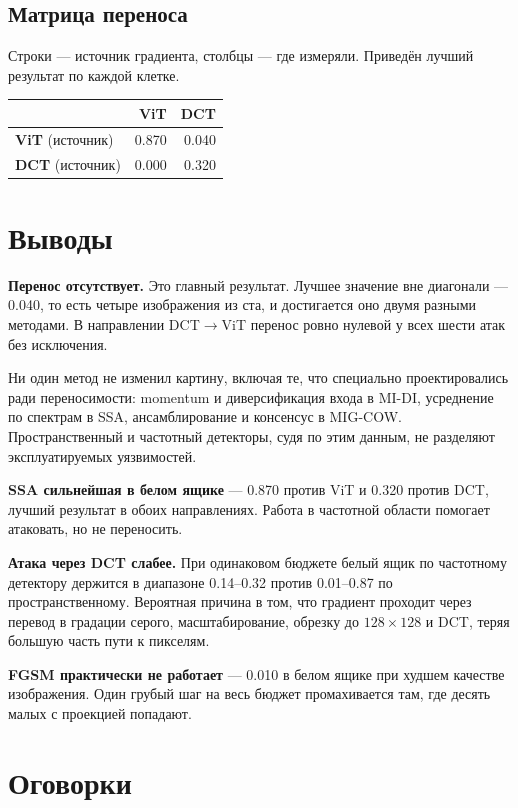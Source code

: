 \documentclass[11pt,a4paper]{article}
\begin{document}
\subsection*{Матрица переноса}

Строки — источник градиента, столбцы — где измеряли. Приведён лучший результат
по каждой клетке.

\begin{center}
\begin{tabular}{@{}lrr@{}}
\toprule
& \textbf{ViT} & \textbf{DCT} \\
\midrule
\textbf{ViT} (источник) & 0.870 & 0.040 \\
\textbf{DCT} (источник) & 0.000 & 0.320 \\
\bottomrule
\end{tabular}
\end{center}

\section{Выводы}

\textbf{Перенос отсутствует.} Это главный результат. Лучшее значение вне
диагонали — 0.040, то есть четыре изображения из ста, и достигается оно двумя
разными методами. В направлении DCT${\to}$ViT перенос ровно нулевой у всех
шести атак без исключения.

Ни один метод не изменил картину, включая те, что специально проектировались
ради переносимости: momentum и диверсификация входа в MI-DI, усреднение по
спектрам в SSA, ансамблирование и консенсус в MIG-COW. Пространственный и
частотный детекторы, судя по этим данным, не разделяют эксплуатируемых
уязвимостей.

\textbf{SSA сильнейшая в белом ящике} — 0.870 против ViT и 0.320 против DCT,
лучший результат в обоих направлениях. Работа в частотной области помогает
атаковать, но не переносить.

\textbf{Атака через DCT слабее.} При одинаковом бюджете белый ящик по частотному
детектору держится в диапазоне 0.14–0.32 против 0.01–0.87 по пространственному.
Вероятная причина в том, что градиент проходит через перевод в градации серого,
масштабирование, обрезку до $128{\times}128$ и DCT, теряя большую часть пути к
пикселям.

\textbf{FGSM практически не работает} — 0.010 в белом ящике при худшем качестве
изображения. Один грубый шаг на весь бюджет промахивается там, где десять малых
с проекцией попадают.

\section{Оговорки}
\end{document}

